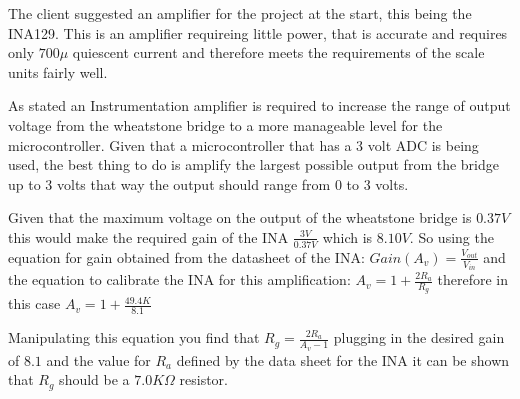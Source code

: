 The client suggested an amplifier for the project at the start, this being the INA129. This is an amplifier requireing little power, that is accurate and requires only $700\mu$ quiescent current and therefore meets the requirements of the scale units fairly well.

As stated an Instrumentation amplifier is required to increase the range of output voltage from the wheatstone bridge to a more manageable level for the microcontroller. Given that a microcontroller that has a $3$ volt ADC is being used, the best thing to do is amplify the largest possible output from the bridge up to $3$ volts that way the output should range from $0$ to $3$ volts. 

Given that the maximum voltage on the output of the wheatstone bridge is $0.37V$ this would make the required gain of the INA $\frac{3V}{0.37V}$ which is $8.10V$. So using the equation for gain obtained from the datasheet of the INA: \(Gain(A_{v}) = \frac{V_{out}}{V_{in}}\) and the equation to calibrate the INA for this amplification: 
$A_v = 1 + \frac{2R_a}{R_g}$ therefore in this case $A_v = 1 + \frac{49.4K}{8.1}$

Manipulating this equation you find that $R_g = \frac{2R_a}{A_v - 1}$ plugging in the desired gain of $8.1$ and the value for $R_a$ defined by the data sheet for the INA it can be shown that $R_g$ should be a $7.0K\Omega$ resistor. 